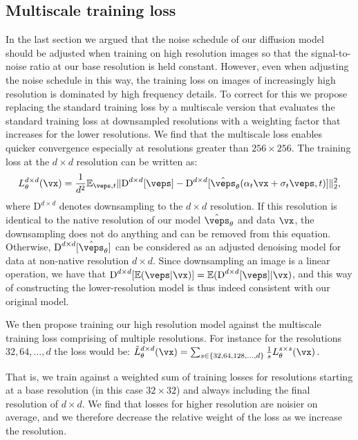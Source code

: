 \subsection{Multiscale training loss}
In the last section we argued that the noise schedule of our diffusion model should be adjusted when training on high resolution images so that the signal-to-noise ratio at our base resolution is held constant. However, even when adjusting the noise schedule in this way, the training loss on images of increasingly high resolution is dominated by high frequency details. To correct for this we propose replacing the standard training loss by a multiscale version that evaluates the standard training loss at downsampled resolutions with a weighting factor that increases for the lower resolutions. We find that the multiscale loss enables quicker convergence especially at resolutions greater than $256 \times 256$. The training loss at the $d \times d$ resolution can be written as:
\[L^{d \times d}_{\theta}(\vx) = \frac{1}{d^{2}}\mathbb{E}_{\veps,t} \lVert \text{D}^{d \times d}[\veps] - \text{D}^{d \times d}[\hat{\veps}_{\theta}(\alpha_t \vx+\sigma_t \veps, t)] \rVert_{2}^{2},\]
where $\text{D}^{d \times d}$ denotes downsampling to the $d \times d$ resolution. If this resolution is identical to the native resolution of our model $\hat{\veps}_{\theta}$ and data $\vx$, the downsampling does not do anything and can be removed from this equation. Otherwise, $\text{D}^{d \times d}[\hat{\veps}_{\theta}]$ can be considered as an adjusted denoising model for data at non-native resolution $d \times d$. Since downsampling an image is a linear operation, we have that $\text{D}^{d \times d}[\mathbb{E}(\veps|\vx)] = \mathbb{E}(\text{D}^{d \times d}[\veps]|\vx)$, and this way of constructing the lower-resolution model is thus indeed consistent with our original model.

We then propose training our high resolution model against the multiscale training loss comprising of multiple resolutions. For instance for the resolutions $32, 64, \ldots, d$ the loss would be: 
$\tilde{L}^{d \times d}_{\theta}(\vx) = \sum_{s \in \{32, 64, 128, \ldots, d\}} \frac{1}{s} L^{s \times s}_{\theta}(\vx)$.

That is, we train against a weighted sum of training losses for resolutions starting at a base resolution (in this case $32 \times 32$) and always including the final resolution of $d \times d$. We find that losses for higher resolution are noisier on average, and we therefore decrease the relative weight of the loss as we increase the resolution.

